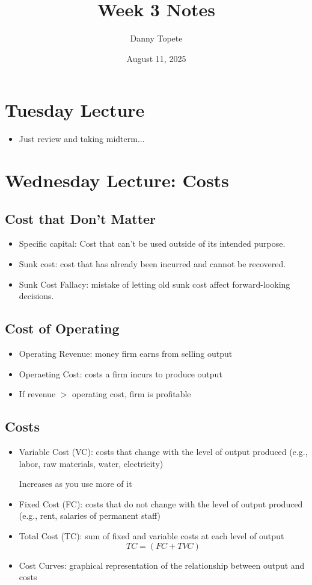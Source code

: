 \documentclass{article}
\title{Week 3 Notes}
\author{Danny Topete}
\date{August 11, 2025}
\begin{document}
\maketitle
\section{Tuesday Lecture}
\begin{itemize}
  \item Just review and taking midterm...
\end{itemize}

\section{Wednesday Lecture: Costs}
\subsection{Cost that Don't Matter}
\begin{itemize}
  \item Specific capital: Cost that can't be used outside of its intended purpose.
  \item Sunk cost: cost that has already been incurred and cannot be recovered.
  \item Sunk Cost Fallacy: mistake of letting old sunk cost affect forward-looking decisions.
\end{itemize}

\subsection{Cost of Operating}
\begin{itemize}
  \item Operating Revenue: money firm earns from selling output
  \item Operaeting Cost: costs a firm incurs to produce output
  \item If revenue $>$ operating cost, firm is profitable
\end{itemize}

\subsection{Costs}
\begin{itemize}
  \item Variable Cost (VC): costs that change with the level of output produced (e.g., labor, raw materials, water, electricity)

    Increases as you use more of it
  \item Fixed Cost (FC): costs that do not change with the level of output produced (e.g., rent, salaries of permanent staff)
  \item Total Cost (TC): sum of fixed and variable costs at each level of output
    $$ TC = (FC + TVC)$$
  \item Cost Curves: graphical representation of the relationship between output and costs
\end{itemize}
\end{document}

